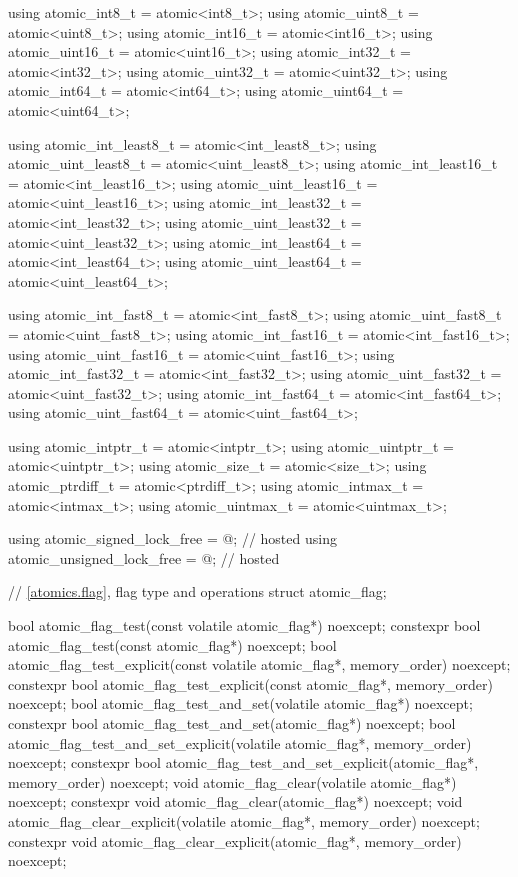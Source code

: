 \begin{codeblock}
{  using atomic_int8_t         = atomic<int8_t>;
  using atomic_uint8_t        = atomic<uint8_t>;
  using atomic_int16_t        = atomic<int16_t>;
  using atomic_uint16_t       = atomic<uint16_t>;
  using atomic_int32_t        = atomic<int32_t>;
  using atomic_uint32_t       = atomic<uint32_t>;
  using atomic_int64_t        = atomic<int64_t>;
  using atomic_uint64_t       = atomic<uint64_t>;

  using atomic_int_least8_t   = atomic<int_least8_t>;
  using atomic_uint_least8_t  = atomic<uint_least8_t>;
  using atomic_int_least16_t  = atomic<int_least16_t>;
  using atomic_uint_least16_t = atomic<uint_least16_t>;
  using atomic_int_least32_t  = atomic<int_least32_t>;
  using atomic_uint_least32_t = atomic<uint_least32_t>;
  using atomic_int_least64_t  = atomic<int_least64_t>;
  using atomic_uint_least64_t = atomic<uint_least64_t>;

  using atomic_int_fast8_t    = atomic<int_fast8_t>;
  using atomic_uint_fast8_t   = atomic<uint_fast8_t>;
  using atomic_int_fast16_t   = atomic<int_fast16_t>;
  using atomic_uint_fast16_t  = atomic<uint_fast16_t>;
  using atomic_int_fast32_t   = atomic<int_fast32_t>;
  using atomic_uint_fast32_t  = atomic<uint_fast32_t>;
  using atomic_int_fast64_t   = atomic<int_fast64_t>;
  using atomic_uint_fast64_t  = atomic<uint_fast64_t>;

  using atomic_intptr_t       = atomic<intptr_t>;
  using atomic_uintptr_t      = atomic<uintptr_t>;
  using atomic_size_t         = atomic<size_t>;
  using atomic_ptrdiff_t      = atomic<ptrdiff_t>;
  using atomic_intmax_t       = atomic<intmax_t>;
  using atomic_uintmax_t      = atomic<uintmax_t>;

  using atomic_signed_lock_free   = @\seebelow@;                  // hosted
  using atomic_unsigned_lock_free = @\seebelow@;                  // hosted

  // \ref{atomics.flag}, flag type and operations
  struct atomic_flag;

  bool atomic_flag_test(const volatile atomic_flag*) noexcept;
  constexpr bool atomic_flag_test(const atomic_flag*) noexcept;
  bool atomic_flag_test_explicit(const volatile atomic_flag*, memory_order) noexcept;
  constexpr bool atomic_flag_test_explicit(const atomic_flag*, memory_order) noexcept;
  bool atomic_flag_test_and_set(volatile atomic_flag*) noexcept;
  constexpr bool atomic_flag_test_and_set(atomic_flag*) noexcept;
  bool atomic_flag_test_and_set_explicit(volatile atomic_flag*, memory_order) noexcept;
  constexpr bool atomic_flag_test_and_set_explicit(atomic_flag*, memory_order) noexcept;
  void atomic_flag_clear(volatile atomic_flag*) noexcept;
  constexpr void atomic_flag_clear(atomic_flag*) noexcept;
  void atomic_flag_clear_explicit(volatile atomic_flag*, memory_order) noexcept;
  constexpr void atomic_flag_clear_explicit(atomic_flag*, memory_order) noexcept;

}
\end{codeblock}
